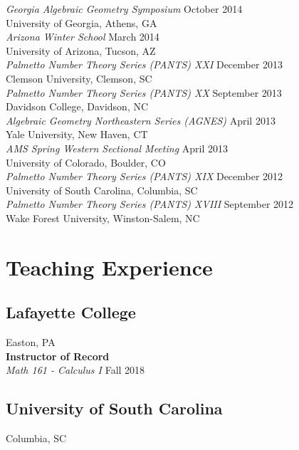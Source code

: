 \documentclass{article}
\begin{document}
\noindent\textsl{Georgia Algebraic Geometry Symposium} \hfill October 2014\\
University of Georgia, Athens, GA\\

\noindent\textsl{Arizona Winter School} \hfill March 2014\\
University of Arizona, Tucson, AZ\\

\noindent\textsl{Palmetto Number Theory Series (PANTS) XXI} \hfill December 2013\\
Clemson University, Clemson, SC\\

\noindent\textsl{Palmetto Number Theory Series (PANTS) XX} \hfill September 2013\\
Davidson College, Davidson, NC\\

\noindent\textsl{Algebraic Geometry Northeastern Series (AGNES)} \hfill April 2013\\
Yale University, New Haven, CT\\

\noindent\textsl{AMS Spring Western Sectional Meeting} \hfill April 2013\\
University of Colorado, Boulder, CO\\

\noindent\textsl{Palmetto Number Theory Series (PANTS) XIX} \hfill December 2012\\
University of South Carolina, Columbia, SC\\

\noindent\textsl{Palmetto Number Theory Series (PANTS) XVIII} \hfill September 2012\\
Wake Forest University, Winston-Salem, NC

\section*{Teaching Experience}
\subsection*{Lafayette College}
\noindent Easton, PA\\

\noindent\textbf{Instructor of Record}\\
\textsl{Math 161 - Calculus I} \hfill Fall 2018

\subsection*{University of South Carolina}
\noindent Columbia, SC\\
\end{document}
